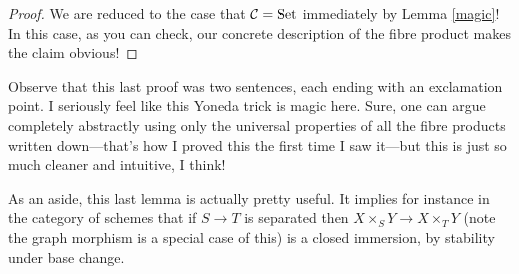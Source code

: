 \begin{proof}
  We are reduced to the case that $\mathcal{C} = {\operatorname{\textup{Set}}}$ immediately by Lemma
  \ref{magic}! In this case, as you can check, our concrete
  description of the fibre product makes the claim obvious!
\end{proof}

Observe that this last proof was two sentences, each ending with an
exclamation point. I seriously feel like this Yoneda trick is magic
here. Sure, one can argue completely abstractly using only the
universal properties of all the fibre products written down---that's
how I proved this the first time I saw it---but this is just so much
cleaner and intuitive, I think!

\begin{remark}
  As an aside, this last lemma is actually pretty useful. It implies
  for instance in the category of schemes that if $S \to T$ is
  separated then $X \times_S Y \to X \times_T Y$ (note the graph
  morphism is a special case of this) is a closed immersion, by
  stability under base change.
\end{remark}






